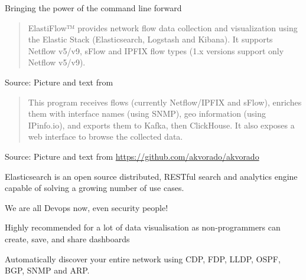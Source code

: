 \documentclass[Screen16to9,17pt]{foils}
\begin{document}




\centerline{Bringing the power of the command line forward}



\begin{quote}
  ElastiFlow™ provides network flow data collection and visualization using the Elastic Stack (Elasticsearch, Logstash and Kibana). It supports Netflow v5/v9, sFlow and IPFIX flow types (1.x versions support only Netflow v5/v9).
\end{quote}
Source: Picture and text from  \\



\begin{quote}
This program receives flows (currently Netflow/IPFIX and sFlow), enriches them with interface names (using SNMP), geo information (using IPinfo.io), and exports them to Kafka, then ClickHouse. It also exposes a web interface to browse the collected data.
\end{quote}
Source: Picture and text from \url{https://github.com/akvorado/akvorado}




Elasticsearch is an open source distributed, RESTful search and analytics engine capable of solving a growing number of use cases.


\centerline{We are all Devops now, even security people!}

Highly recommended for a lot of data visualisation as non-programmers can create, save, and share dashboards





Automatically discover your entire network using CDP, FDP, LLDP, OSPF, BGP, SNMP and ARP.







\slidenext
\end{document}
